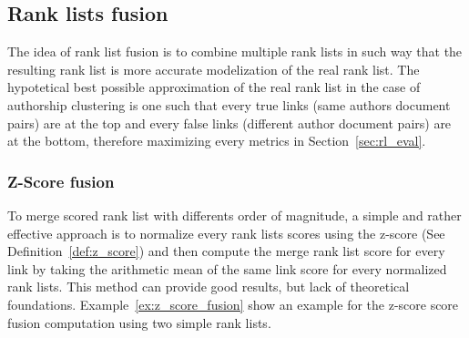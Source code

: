 \subsection{Rank lists fusion}
\label{sec:rank_lists_fusion}

The idea of rank list fusion is to combine multiple rank lists in such way that the resulting rank list is more accurate modelization of the real rank list.
The hypotetical best possible approximation of the real rank list in the case of authorship clustering is one such that  every true links (same authors document pairs) are at the top and every false links (different author document pairs) are at the bottom, therefore maximizing every metrics in Section~\ref{sec:rl_eval}.

\subsubsection{Z-Score fusion}

To merge scored rank list with differents order of magnitude, a simple and rather effective approach is to normalize every rank lists scores using the z-score (See Definition~\ref{def:z_score}) and then compute the merge rank list score for every link by taking the arithmetic mean of the same link score for every normalized rank lists.
This method can provide good results, but lack of theoretical foundations.
Example~\ref{ex:z_score_fusion} show an example for the z-score score fusion computation using two simple rank lists.

